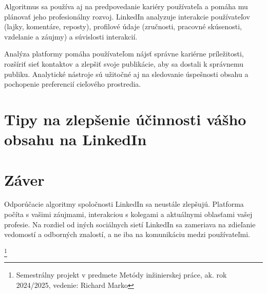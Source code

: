 \documentclass[twoside,slovak,a4paper]{coursepaper}
\begin{document}
Algoritmus sa používa aj na predpovedanie kariéry používateľa a pomáha mu plánovať jeho profesionálny rozvoj. LinkedIn analyzuje interakcie používateľov (lajky, komentáre, reposty), profilové údaje (zručnosti, pracovné skúsenosti, vzdelanie a záujmy) a súvislosti interakcií.~\cite{Bano:article}

Analýza platformy pomáha používateľom nájsť správne kariérne príležitosti, rozšíriť sieť kontaktov a zlepšiť svoje publikácie, aby sa dostali k správnemu publiku. Analytické nástroje sú užitočné aj na sledovanie úspešnosti obsahu a pochopenie preferencií cieľového prostredia.


\section{Tipy na zlepšenie účinnosti vášho obsahu na LinkedIn} \label{Tipy}

\section{Záver} \label{zaver}
Odporúčacie algoritmy spoločnosti LinkedIn sa neustále zlepšujú. Platforma počíta s vašimi záujmami, interakciou s kolegami a aktuálnymi oblasťami vašej profesie. Na rozdiel od iných sociálnych sietí LinkedIn sa zameriava na zdieľanie vedomostí a odborných znalostí, a ne iba na komunikáciu medzi používateľmi.

\thanks{Semestrálny projekt v predmete Metódy inžinierskej práce, ak. rok 2024/2025, vedenie: Richard Marko}


 
\end{document}
